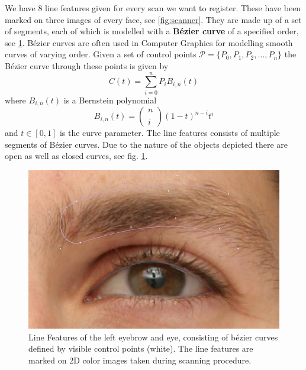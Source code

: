 We have 8 line features given for every scan we want to register. These have been marked on three images of every face, see \ref{fig:scanner}. They are made up of a set of segments, each of which is modelled with a \textbf{B\'{e}zier curve} of a specified order, see \ref{fig:linefeatures}. B\'{e}zier curves are often used in Computer
Graphics for modelling smooth curves of varying order. Given a set of control points $\mathcal{P} = \{P_{0}, P_{1}, P_{2}, \ldots, P_{n}\}$ the B\'{e}zier curve through these points is given by
\begin{equation}
    C(t)=\sum_{i=0}^{n}P_{i}B_{i,n}(t)
\end{equation}
where $B_{i,n}(t)$ is a Bernstein polynomial 
\begin{equation}
    B_{i,n}(t)=\begin{pmatrix} n \\ \\ i \end{pmatrix}(1-t)^{n-i}t^i
\end{equation}
and $t \in [0,1]$ is the curve parameter. The line features consists of multiple segments of B\'{e}zier curves. Due to the nature of the objects depicted there are open as well as closed curves, see fig. \ref{fig:linefeatures}. 

\begin{figure}[h!]
    \centering
\includegraphics[width=\textwidth]{./resources/img/eyebrow_left.jpeg}
\caption{Line Features of the left eyebrow and eye, consisting of b\'{e}zier curves defined by visible control points (white). The line features are marked on 2D color images taken during scanning procedure.}
\label{fig:linefeatures}
\end{figure}

